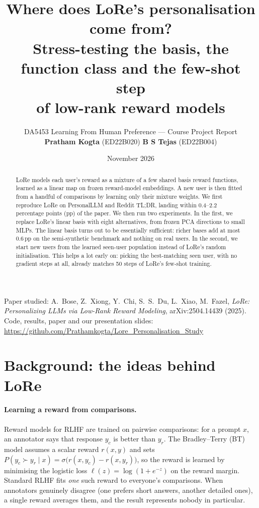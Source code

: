 \documentclass[11pt,a4paper]{article}
\title{\vspace{-1.2cm}\textbf{Where does LoRe's personalisation come from?}\\[2pt]
\large Stress-testing the basis, the function class and the few-shot step\\ of low-rank reward models}
\author{
\begin{tabular}{c}
DA5453 Learning From Human Preference --- Course Project Report\\[4pt]
\textbf{Pratham Kogta} (ED22B020) \qquad \textbf{B S Tejas} (ED22B004)
\end{tabular}}
\date{November 2026}
\newcommand{\repourl}{https://github.com/Prathamkogta/Lore_Personalisation_Study}
\newcommand{\pp}{\,pp\xspace}
\begin{document}
\maketitle
\vspace{-0.6cm}
\begin{center}
\small Paper studied: A.~Bose, Z.~Xiong, Y.~Chi, S.~S.~Du, L.~Xiao, M.~Fazel,
\emph{LoRe: Personalizing LLMs via Low-Rank Reward Modeling}, arXiv:2504.14439 (2025).\\
Code, results, paper and our presentation slides: \url{\repourl}
\end{center}


\begin{abstract}
\noindent LoRe models each user's reward as a mixture of a few shared basis reward functions, learned
as a linear map on frozen reward-model embeddings. A new user is then fitted from a handful of
comparisons by learning only their mixture weights. We first reproduce LoRe on PersonalLLM and Reddit
TL;DR, landing within 0.4--2.2 percentage points (pp) of the paper. We then run two experiments. In the
first, we replace LoRe's linear basis with eight alternatives, from frozen PCA directions to small
MLPs. The linear basis turns out to be essentially sufficient: richer bases add at most 0.6\pp on the
semi-synthetic benchmark and nothing on real users. In the second, we start new users from the
learned seen-user population instead of LoRe's random initialisation. This helps a lot early on: picking
the best-matching seen user, with no gradient steps at all, already matches 50 steps of LoRe's
few-shot training.
\end{abstract}

\section{Background: the ideas behind LoRe}
\label{sec:background}

\paragraph{Learning a reward from comparisons.} Reward models for RLHF are trained on pairwise
comparisons: for a prompt $x$, an annotator says that response $y_c$ is better than $y_r$. The
Bradley--Terry (BT) model \citep{bradley1952rank,christiano2017deep} assumes a scalar reward $r(x,y)$ and
sets $P(y_c\succ y_r\mid x)=\sigma\big(r(x,y_c)-r(x,y_r)\big)$, so the reward is learned by minimising the
logistic loss $\ell(z)=\log(1+e^{-z})$ on the reward margin. Standard RLHF fits \emph{one} such reward to
everyone's comparisons. When annotators genuinely disagree (one prefers short answers, another
detailed ones), a single reward averages them, and the result represents nobody in particular.
\end{document}

